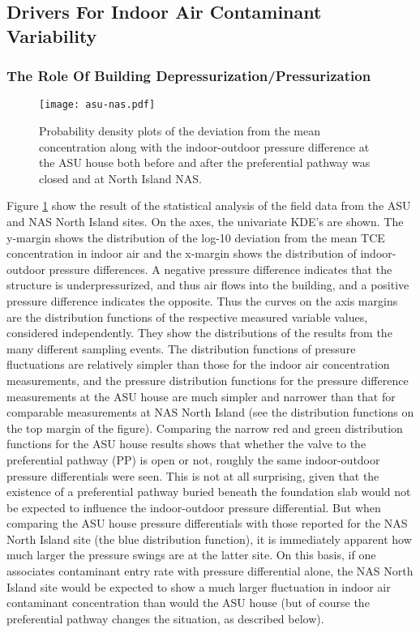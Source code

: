 \documentclass[journal=esthag,manuscript=article]{achemso}
\begin{document}
\subsection{Drivers For Indoor Air Contaminant Variability}

\subsubsection{The Role Of Building Depressurization/Pressurization}

\begin{figure}[htb!]
  \caption{Probability density plots of the deviation from the mean concentration along with the indoor-outdoor pressure difference at the ASU house both before and after the preferential pathway was closed and at North Island NAS.}
  \label{fig:kde-asu-nas}
  \texttt{[image: asu-nas.pdf]}
\end{figure}

Figure \ref{fig:kde-asu-nas} show the result of the statistical analysis of the field data from the ASU and NAS North Island sites.  On the axes, the univariate KDE’s are shown.
The y-margin shows the distribution of the log-10 deviation from the mean TCE concentration in indoor air and the x-margin shows the distribution of indoor-outdoor pressure differences.
A negative pressure difference indicates that the structure is underpressurized, and thus air flows into the building, and a positive pressure difference indicates the opposite.
Thus the curves on the axis margins are the distribution functions of the respective measured variable values, considered independently.
They show the distributions of the results from the many different sampling events.
The distribution functions of pressure fluctuations are relatively simpler than those for the indoor air concentration measurements, and the pressure distribution functions for the pressure difference measurements at the ASU house are much simpler and narrower than that for comparable measurements at NAS North Island (see the distribution functions on the top margin of the figure).
Comparing the narrow red and green distribution functions for the ASU house results shows that whether the valve to the preferential pathway (PP) is open or not, roughly the same indoor-outdoor pressure differentials were seen.
This is not at all surprising, given that the existence of a preferential pathway buried beneath the foundation slab would not be expected to influence the indoor-outdoor pressure differential.
But when comparing the ASU house pressure differentials with those reported for the NAS North Island site (the blue distribution function), it is immediately apparent how much larger the pressure swings are at the latter site.
On this basis, if one associates contaminant entry rate with pressure differential alone, the NAS North Island site would be expected to show a much larger fluctuation in indoor air contaminant concentration than would the ASU house (but of course the preferential pathway changes the situation, as described below).
\end{document}
